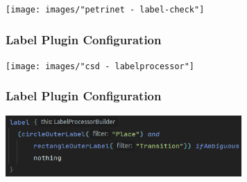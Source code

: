 \begin{frame}
  \frametitle{}
  \centering
  \hspace{-1cm}
  \texttt{[image: images/"petrinet - label-check"]}
\end{frame}






\begin{frame}
  \frametitle{Label Plugin Configuration}
  \centering
  \hspace{-1cm}
  \centering
  \texttt{[image: images/"csd - labelprocessor"]}
\end{frame}

\begin{frame}
  \frametitle{Label Plugin Configuration}
  \centering
  \hspace{-1cm}
  \includegraphics[width=9cm]{images/label-plugin}
\end{frame}


